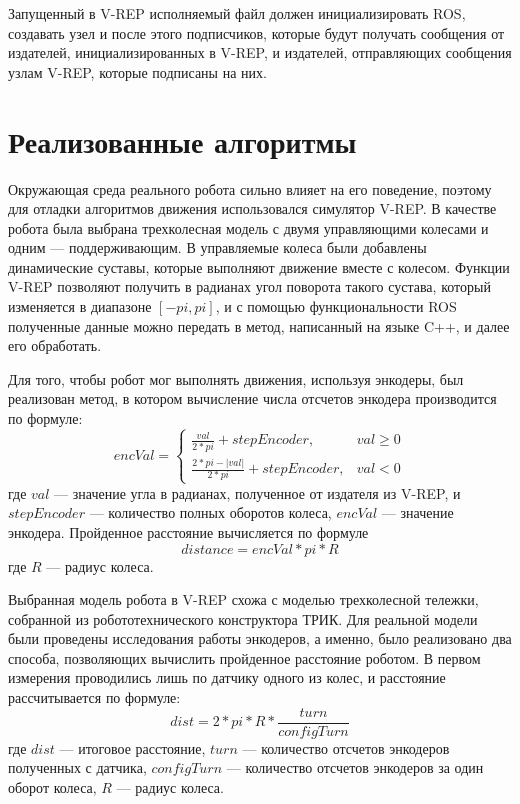 \documentclass{spisok-article}
\begin{document}
Запущенный в V-REP исполняемый файл должен инициализировать ROS, создавать узел и после этого подписчиков, которые будут получать сообщения от издателей, инициализированных в V-REP, и издателей, отправляющих сообщения узлам V-REP, которые подписаны на них.

\section{Реализованные алгоритмы}

Окружающая среда реального робота сильно влияет на его поведение, поэтому для отладки алгоритмов движения использовался симулятор V-REP. В качестве робота была выбрана трехколесная модель с двумя управляющими колесами и одним --- поддерживающим. В управляемые колеса  были добавлены динамические суставы, которые выполняют движение вместе с колесом. Функции V-REP позволяют получить в радианах угол поворота такого сустава, который изменяется в диапазоне $[-pi, pi]$, и с помощью функциональности ROS полученные данные можно передать в метод, написанный на языке C++, и далее его обработать. 

Для того, чтобы робот мог выполнять движения, используя энкодеры, был реализован метод, в котором вычисление числа отсчетов энкодера производится по формуле:
\[encVal = \left\{
  \begin{array}{lr}
    \frac{val}{2 * pi} + stepEncoder,             & val \ge 0 \\
    \frac{2 * pi - |val|}{2 * pi} + stepEncoder,  & val < 0
  \end{array}
\right.
\]
где $val$ --- значение угла в радианах, полученное от издателя из V-REP, и $stepEncoder$ --- количество полных оборотов колеса, $encVal$ --- значение энкодера. Пройденное расстояние вычисляется по формуле
$$distance = encVal * pi * R$$
где $R$ --- радиус колеса.

Выбранная модель робота в V-REP схожа с моделью трехколесной тележки, собранной из робототехнического конструктора ТРИК.  Для реальной модели были проведены исследования работы энкодеров, а именно, было реализовано два способа, позволяющих вычислить пройденное расстояние роботом. В первом измерения проводились лишь по датчику одного из колес, и расстояние рассчитывается по формуле:
$$dist = 2 * pi * R * \frac{turn}{configTurn}$$
где $dist$ --- итоговое расстояние, $turn$ --- количество отсчетов энкодеров полученных с датчика, $configTurn$ --- количество отсчетов энкодеров за один оборот колеса, $R$ --- радиус колеса.
\end{document}
